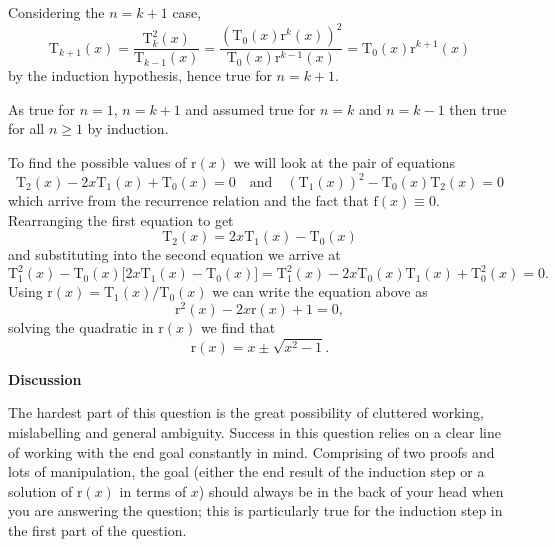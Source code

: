 \documentclass{article}
\begin{document}
\quad Considering the $n=k+1$ case,
\[
\mathrm{T}_{k+1}(x) = \frac{\mathrm{T}^2_{k}(x)}{\mathrm{T}_{k-1}(x)} = \frac{(\mathrm{T}_{0}(x)\mathrm{r}^k(x))^2}{ \mathrm{T}_{0}(x)\mathrm{r}^{k-1}(x)} = \mathrm{T}_{0}(x)\mathrm{r}^{k+1}(x)
\]
by the induction hypothesis, hence true for $n=k+1$.\par 

\quad As true for $n=1$, $n=k+1$ and assumed true for $n=k$ and $n=k-1$ then true for all $n \geq 1$ by induction.

\vspace{0.5cm}

To find the possible values of $\mathrm{r}(x)$ we will look at the pair of equations
\[
\mathrm{T}_{2}(x) -2x \mathrm{T}_{1}(x) + \mathrm{T}_{0}(x) =0 \quad \text{and} \quad \left(\mathrm{T}_1(x)\right)^2 - \mathrm{T}_{0}(x) \mathrm{T}_{2}(x) = 0
\]
which arrive from the recurrence relation and the fact that $\mathrm{f}(x) \equiv 0$. Rearranging the first equation to get 
\[
\mathrm{T}_{2}(x) = 2x \mathrm{T}_{1}(x) - \mathrm{T}_{0}(x)
\]
and substituting into the second equation we arrive at
\[
\mathrm{T}^2_1(x) - \mathrm{T}_{0}(x)\Big[2x \mathrm{T}_{1}(x) - \mathrm{T}_{0}(x)\Big] = \mathrm{T}^2_1(x) - 2x\mathrm{T}_{0}(x)\mathrm{T}_{1}(x) + \mathrm{T}_{0}^2(x) = 0.
\]
Using $\mathrm{r}(x) = \mathrm{T}_{1}(x)/ \mathrm{T}_{0}(x)$ we can write the equation above as
\[
\mathrm{r}^2(x) - 2x\mathrm{r}(x)+1 =0,
\]
solving the quadratic in $\mathrm{r}(x)$ we find that
\[
\mathrm{r}(x) = x \pm \sqrt{x^2-1}.
\]

\newpage
\begin{center}
    \textbf{Discussion}
\end{center}

\vspace{0.5cm}

The hardest part of this question is the great possibility of cluttered working, mislabelling and general ambiguity. Success in this question relies on a clear line of working with the end goal constantly in mind. Comprising of two proofs and lots of manipulation, the goal (either the end result of the induction step or a solution of $\mathrm{r}(x)$ in terms of $x$) should always be in the back of your head when you are answering the question; this is particularly true for the induction step in the first part of the question.\par
\end{document}
